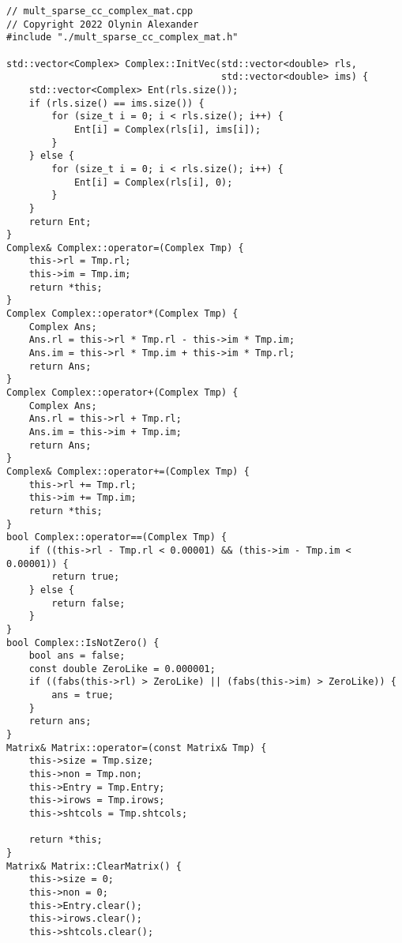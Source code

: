 \documentclass{report}
\begin{document}
\begin{lstlisting}
// mult_sparse_cc_complex_mat.cpp
// Copyright 2022 Olynin Alexander
#include "./mult_sparse_cc_complex_mat.h"

std::vector<Complex> Complex::InitVec(std::vector<double> rls,
                                      std::vector<double> ims) {
    std::vector<Complex> Ent(rls.size());
    if (rls.size() == ims.size()) {
        for (size_t i = 0; i < rls.size(); i++) {
            Ent[i] = Complex(rls[i], ims[i]);
        }
    } else {
        for (size_t i = 0; i < rls.size(); i++) {
            Ent[i] = Complex(rls[i], 0);
        }
    }
    return Ent;
}
Complex& Complex::operator=(Complex Tmp) {
    this->rl = Tmp.rl;
    this->im = Tmp.im;
    return *this;
}
Complex Complex::operator*(Complex Tmp) {
    Complex Ans;
    Ans.rl = this->rl * Tmp.rl - this->im * Tmp.im;
    Ans.im = this->rl * Tmp.im + this->im * Tmp.rl;
    return Ans;
}
Complex Complex::operator+(Complex Tmp) {
    Complex Ans;
    Ans.rl = this->rl + Tmp.rl;
    Ans.im = this->im + Tmp.im;
    return Ans;
}
Complex& Complex::operator+=(Complex Tmp) {
    this->rl += Tmp.rl;
    this->im += Tmp.im;
    return *this;
}
bool Complex::operator==(Complex Tmp) {
    if ((this->rl - Tmp.rl < 0.00001) && (this->im - Tmp.im < 0.00001)) {
        return true;
    } else {
        return false;
    }
}
bool Complex::IsNotZero() {
    bool ans = false;
    const double ZeroLike = 0.000001;
    if ((fabs(this->rl) > ZeroLike) || (fabs(this->im) > ZeroLike)) {
        ans = true;
    }
    return ans;
}
Matrix& Matrix::operator=(const Matrix& Tmp) {
    this->size = Tmp.size;
    this->non = Tmp.non;
    this->Entry = Tmp.Entry;
    this->irows = Tmp.irows;
    this->shtcols = Tmp.shtcols;

    return *this;
}
Matrix& Matrix::ClearMatrix() {
    this->size = 0;
    this->non = 0;
    this->Entry.clear();
    this->irows.clear();
    this->shtcols.clear();


\end{lstlisting}
\end{document}
